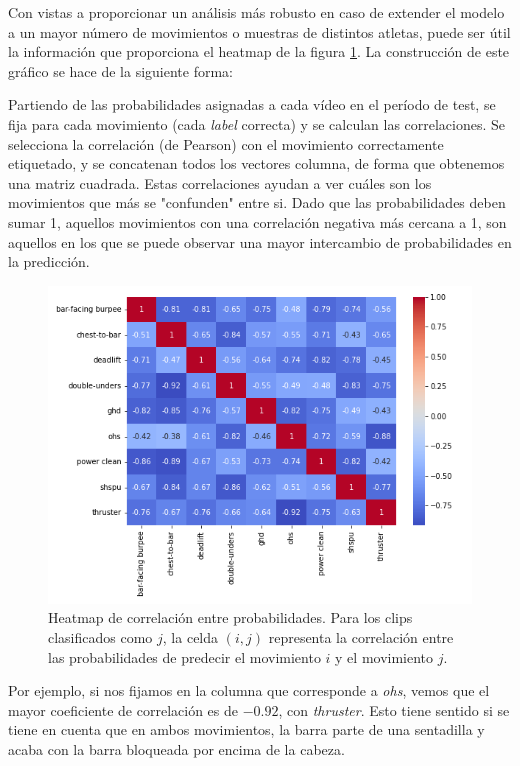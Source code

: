 Con vistas a proporcionar un análisis más robusto en caso de extender el modelo a un mayor número de movimientos o muestras de distintos atletas, puede ser útil la información que proporciona el heatmap de la figura \ref{heatmap_correlations}. La construcción de este gráfico se hace de la siguiente forma:

Partiendo de las probabilidades asignadas a cada vídeo en el período de test, se fija para cada movimiento (cada \textit{label} correcta) y se calculan las correlaciones. Se selecciona la correlación (de Pearson) con el movimiento correctamente etiquetado, y se concatenan todos los vectores columna, de forma que obtenemos una matriz cuadrada. Estas correlaciones ayudan a ver cuáles son los movimientos que más se "confunden" entre si. Dado que las probabilidades deben sumar 1, aquellos movimientos con una correlación negativa más cercana a 1, son aquellos en los que se puede observar una mayor intercambio de probabilidades en la predicción.

\begin{figure}[H]
    \centering
		\includegraphics[width=\textwidth]{figs/heatmap_correlations.png}
\caption{Heatmap de correlación entre probabilidades. Para los clips clasificados como $j$, la celda $(i, j)$ representa la correlación entre las probabilidades de predecir el movimiento $i$ y el movimiento $j$.}\label{heatmap_correlations}
\end{figure}

Por ejemplo, si nos fijamos en la columna que corresponde a \textit{ohs}, vemos que el mayor coeficiente de correlación es de $-0.92$, con \textit{thruster}. Esto tiene sentido si se tiene en cuenta que en ambos movimientos, la barra parte de una sentadilla y acaba con la barra bloqueada por encima de la cabeza.

